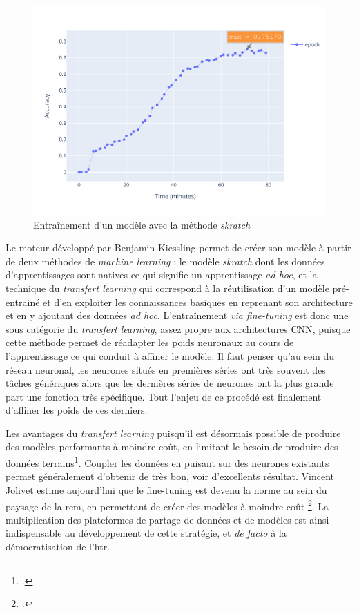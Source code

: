	\begin{figure}[h]
	    \centering
	    \includegraphics[width=1.1\textwidth]{annexes/graph/train_epoch.png}
	    \caption{Entraînement d'un modèle avec la méthode \textit{skratch}}
	    \label{fig:epoch_skratch}
	\end{figure}
	
	Le moteur développé par Benjamin Kiessling permet de créer son modèle à partir de deux méthodes de \textit{machine learning} : le modèle \textit{skratch} dont les données d'apprentissages sont natives ce qui signifie un apprentissage \textit{ad hoc}, et la technique du \textit{transfert learning} qui correspond à la réutilisation d'un modèle pré-entrainé et d'en exploiter les connaissances basiques en reprenant son architecture et en y ajoutant des données \textit{ad hoc}. L'entraînement \textit{via fine-tuning} est donc une sous catégorie du \textit{transfert learning}, assez propre aux architectures \gls{CNN}, puisque cette méthode permet de réadapter les poids neuronaux au cours de l'apprentissage ce qui conduit à affiner le modèle. Il faut penser qu'au sein du réseau neuronal, les neurones situés en premières séries ont très souvent des tâches génériques alors que les dernières séries de neurones ont la plus grande part une fonction très spécifique. Tout l'enjeu de ce procédé est finalement d'affiner les poids de ces derniers.
	
	Les avantages du \textit{transfert learning} puisqu'il est désormais possible de produire des modèles performants à moindre coût, en limitant le besoin de produire des données terrains\footcite{aradillasBoostingHandwritingText2018}. Coupler les données en puisant sur des neurones existants permet généralement d'obtenir de très bon, voir d'excellents résultat. Vincent Jolivet estime aujourd'hui que le fine-tuning est devenu la norme au sein du paysage de la \gls{rem}, en permettant de créer des modèles à moindre coût \footcite{torresHTRFineTuning2022}. La multiplication des plateformes de partage de données et de modèles est ainsi indispensable au développement de cette stratégie, et \textit{de facto} à la démocratisation de l'\gls{htr}.
	
